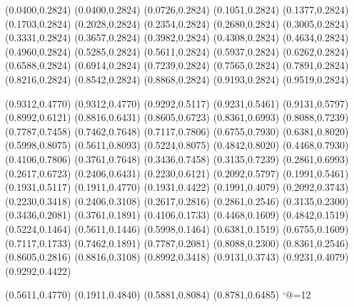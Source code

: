 \PST@Border(0.0400,0.2824)
(0.0400,0.2824)
(0.0726,0.2824)
(0.1051,0.2824)
(0.1377,0.2824)
(0.1703,0.2824)
(0.2028,0.2824)
(0.2354,0.2824)
(0.2680,0.2824)
(0.3005,0.2824)
(0.3331,0.2824)
(0.3657,0.2824)
(0.3982,0.2824)
(0.4308,0.2824)
(0.4634,0.2824)
(0.4960,0.2824)
(0.5285,0.2824)
(0.5611,0.2824)
(0.5937,0.2824)
(0.6262,0.2824)
(0.6588,0.2824)
(0.6914,0.2824)
(0.7239,0.2824)
(0.7565,0.2824)
(0.7891,0.2824)
(0.8216,0.2824)
(0.8542,0.2824)
(0.8868,0.2824)
(0.9193,0.2824)
(0.9519,0.2824)

\PST@Dashed(0.9312,0.4770)
(0.9312,0.4770)
(0.9292,0.5117)
(0.9231,0.5461)
(0.9131,0.5797)
(0.8992,0.6121)
(0.8816,0.6431)
(0.8605,0.6723)
(0.8361,0.6993)
(0.8088,0.7239)
(0.7787,0.7458)
(0.7462,0.7648)
(0.7117,0.7806)
(0.6755,0.7930)
(0.6381,0.8020)
(0.5998,0.8075)
(0.5611,0.8093)
(0.5224,0.8075)
(0.4842,0.8020)
(0.4468,0.7930)
(0.4106,0.7806)
(0.3761,0.7648)
(0.3436,0.7458)
(0.3135,0.7239)
(0.2861,0.6993)
(0.2617,0.6723)
(0.2406,0.6431)
(0.2230,0.6121)
(0.2092,0.5797)
(0.1991,0.5461)
(0.1931,0.5117)
(0.1911,0.4770)
(0.1931,0.4422)
(0.1991,0.4079)
(0.2092,0.3743)
(0.2230,0.3418)
(0.2406,0.3108)
(0.2617,0.2816)
(0.2861,0.2546)
(0.3135,0.2300)
(0.3436,0.2081)
(0.3761,0.1891)
(0.4106,0.1733)
(0.4468,0.1609)
(0.4842,0.1519)
(0.5224,0.1464)
(0.5611,0.1446)
(0.5998,0.1464)
(0.6381,0.1519)
(0.6755,0.1609)
(0.7117,0.1733)
(0.7462,0.1891)
(0.7787,0.2081)
(0.8088,0.2300)
(0.8361,0.2546)
(0.8605,0.2816)
(0.8816,0.3108)
(0.8992,0.3418)
(0.9131,0.3743)
(0.9231,0.4079)
(0.9292,0.4422)

\PST@Circle(0.5611,0.4770)
\PST@Fillcircle(0.1911,0.4840)
\PST@Fillcircle(0.5881,0.8084)
\PST@Fillcircle(0.8781,0.6485)
\catcode`@=12
\fi
\endpspicture
